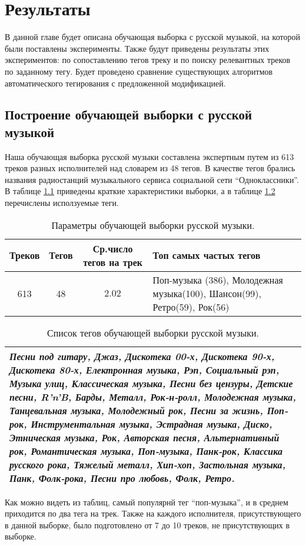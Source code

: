 \chapter{Результаты} 
\label{results}

В данной главе будет описана обучающая выборка с русской музыкой, на которой были поставлены эксперименты. 
Также будут приведены результаты этих экспериментов: по сопоставлению тегов треку 
и по поиску релевантных треков по заданному тегу. Будет проведено сравнение существующих алгоритмов
автоматического тегирования с предложенной модификацией.

\section{Построение обучающей выборки с русской музыкой}

Наша обучающая выборка русской музыки составлена экспертным путем из 613 треков разных исполнителей над словарем из 48 тегов. 
В качестве тегов брались названия радиостанций музыкального сервиса социальной сети ``Одноклассники''.
В таблице \ref{tab:rus_dataset} приведены краткие характеристики выборки, а в таблице \ref{tab:tags} перечислены исползуемые теги.
\begin{table}[ht]
\centering
\captionsetup{justification=centering}
\caption{Параметры обучающей выборки русской музыки.}
\label{tab:rus_dataset}
\begin{tabular}{ |c c c p{5cm}| }
  \hline    
  Треков & Тегов & Ср.число тегов на трек & Топ самых частых тегов \\  
  \hline    
  613 & 48 & $2.02$ & 
  Поп-музыка (386), Молодежная музыка(100), Шансон(99), Ретро(59), Рок(56) \\  
  \hline    
\end{tabular}
\end{table}

\begin{table}[ht]
\centering
\captionsetup{justification=centering}
\caption{Список тегов обучающей выборки русской музыки.}
\label{tab:tags}
\begin{tabular}{ |p{15cm}| }
  \hline    
  \emph{Песни под гитару, Джаз, Дискотека 00-х, Дискотека 90-х, Дискотека 80-х, Електронная музыка,
Рэп, Социальный рэп, Музыка улиц, Классическая музыка, Песни без цензуры, Детские песни, R'n'B, Барды, Металл, Рок-н-ролл,
Молодежная музыка, Танцевальная музыка, Молодежный рок, Песни за жизнь, Поп-рок, Инструментальная музыка, Эстрадная музыка,
Диско, Этническая музыка, Рок, Авторская песня, Альтернативный рок, Романтическая музыка, Поп-музыка, Панк-рок,
Классика русского рока, Тяжелый металл, Хип-хоп, Застольная музыка, Панк, Фолк-рока, Песни про любовь, Фолк, Ретро.}\\
\hline    
\end{tabular}
\end{table}
Как можно видеть из таблиц, самый популярнй тег \ld ``поп-музыка'', и в среднем приходится по два тега на трек.
Также на каждого исполнителя, присутствующего в данной выборке, было подготовлено от 7 до 10 треков, не присутствующих в выборке.

